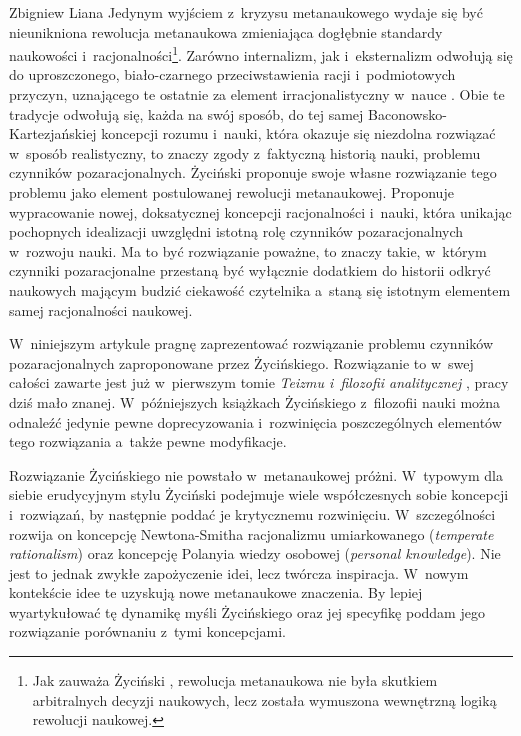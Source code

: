 \begin{artplenv}{Zbigniew Liana}
Jedynym wyjściem z~kryzysu metanaukowego wydaje się być nieunikniona rewolucja metanaukowa zmieniająca dogłębnie standardy naukowości i~racjonalności\footnote{Jak zauważa Życiński
\parencites*[][s.~202]{zycinski_structure_1988}[][s.~352]{zycinski_struktura_2013_liana}, %
 rewolucja metanaukowa nie była skutkiem arbitralnych decyzji naukowych, lecz została wymuszona wewnętrzną logiką rewolucji naukowej.}. Zarówno internalizm, jak i~eksternalizm odwołują się do uproszczonego, biało-czarnego przeciwstawienia racji i~podmiotowych przyczyn, uznającego te ostatnie za element irracjonalistyczny w~nauce 
\parencite[][s.~227]{zycinski_teizm_1985}. %
 Obie te tradycje odwołują się, każda na swój sposób, do tej samej Baconowsko-Kartezjańskiej koncepcji rozumu i~nauki, która okazuje się niezdolna rozwiązać w~sposób realistyczny, to znaczy zgody z~faktyczną historią nauki, problemu czynników pozaracjonalnych. Życiński proponuje swoje własne rozwiązanie tego problemu jako element postulowanej rewolucji metanaukowej. Proponuje wypracowanie nowej, doksatycznej koncepcji racjonalności i~nauki, która unikając pochopnych idealizacji uwzględni istotną rolę czynników pozaracjonalnych w~rozwoju nauki. Ma to być rozwiązanie poważne, to znaczy takie, w~którym czynniki pozaracjonalne przestaną być wyłącznie dodatkiem do historii odkryć naukowych mającym budzić ciekawość czytelnika a~staną się istotnym elementem samej racjonalności naukowej.

W~niniejszym artykule pragnę zaprezentować rozwiązanie problemu czynników pozaracjonalnych zaproponowane przez Życińskiego. Rozwiązanie to w~swej całości zawarte jest już w~pierwszym tomie \textit{Teizmu i~filozofii analitycznej}
\parencite*[][]{zycinski_teizm_1985}, %
 pracy dziś mało znanej. W~późniejszych książkach Życińskiego z~filozofii nauki można odnaleźć jedynie pewne doprecyzowania i~rozwinięcia poszczególnych elementów tego rozwiązania a~także pewne modyfikacje.

Rozwiązanie Życińskiego nie powstało w~metanaukowej próżni. W~typowym dla siebie erudycyjnym stylu Życiński podejmuje wiele współczesnych sobie koncepcji i~rozwiązań, by następnie poddać je krytycznemu rozwinięciu. W~szczególności rozwija on koncepcję Newtona-Smitha racjonalizmu umiarkowanego (\textit{temperate rationalism}) oraz koncepcję Polanyia wiedzy osobowej (\textit{personal knowledge}). Nie jest to jednak zwykłe zapożyczenie idei, lecz twórcza inspiracja. W~nowym kontekście idee te uzyskują nowe metanaukowe znaczenia. By lepiej wyartykułować tę dynamikę myśli Życińskiego oraz jej specyfikę poddam jego rozwiązanie porównaniu z~tymi koncepcjami.


\end{artplenv}

